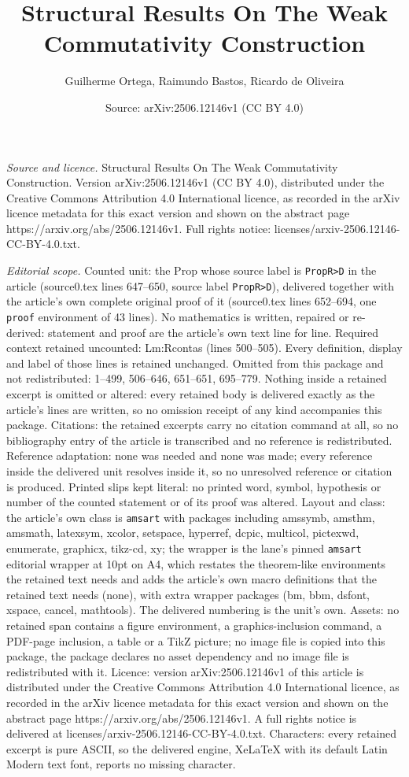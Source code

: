 \documentclass[10pt,a4paper]{amsart}
\title[Structural Results On The Weak Commutativity Construction]{Structural Results On The Weak Commutativity Construction}
\author{Guilherme Ortega, Raimundo Bastos, Ricardo de Oliveira}
\date{Source: arXiv:2506.12146v1 (CC BY 4.0)}
\begin{document}
\maketitle

\noindent\emph{Source and licence.} Structural Results On The Weak Commutativity Construction. Version arXiv:2506.12146v1 (CC BY 4.0), distributed under the Creative Commons Attribution 4.0 International licence, as recorded in the arXiv licence metadata for this exact version and shown on the abstract page https://arxiv.org/abs/2506.12146v1. Full rights notice: licenses/arxiv-2506.12146-CC-BY-4.0.txt.\par\smallskip

\noindent\textit{Editorial scope.} Counted unit: the Prop whose source label is \texttt{PropR>D} in the article (source0.tex lines 647--650, source label \texttt{PropR>D}), delivered together with the article's own complete original proof of it (source0.tex lines 652--694, one \texttt{proof} environment of 43 lines). No mathematics is written, repaired or re-derived: statement and proof are the article's own text line for line. Required context retained uncounted: Lm:Rcontas (lines 500--505). Every definition, display and label of those lines is retained unchanged. Omitted from this package and not redistributed: 1--499, 506--646, 651--651, 695--779. Nothing inside a retained excerpt is omitted or altered: every retained body is delivered exactly as the article's lines are written, so no omission receipt of any kind accompanies this package. Citations: the retained excerpts carry no citation command at all, so no bibliography entry of the article is transcribed and no reference is redistributed. Reference adaptation: none was needed and none was made; every reference inside the delivered unit resolves inside it, so no unresolved reference or citation is produced. Printed slips kept literal: no printed word, symbol, hypothesis or number of the counted statement or of its proof was altered. Layout and class: the article's own class is \texttt{amsart} with packages including amssymb, amsthm, amsmath, latexsym, xcolor, setspace, hyperref, dcpic, multicol, pictexwd, enumerate, graphicx, tikz-cd, xy; the wrapper is the lane's pinned \texttt{amsart} editorial wrapper at 10pt on A4, which restates the theorem-like environments the retained text needs and adds the article's own macro definitions that the retained text needs (none), with extra wrapper packages (bm, bbm, dsfont, xspace, cancel, mathtools). The delivered numbering is the unit's own. Assets: no retained span contains a figure environment, a graphics-inclusion command, a PDF-page inclusion, a table or a TikZ picture; no image file is copied into this package, the package declares no asset dependency and no image file is redistributed with it. Licence: version arXiv:2506.12146v1 of this article is distributed under the Creative Commons Attribution 4.0 International licence, as recorded in the arXiv licence metadata for this exact version and shown on the abstract page https://arxiv.org/abs/2506.12146v1. A full rights notice is delivered at licenses/arxiv-2506.12146-CC-BY-4.0.txt. Characters: every retained excerpt is pure ASCII, so the delivered engine, XeLaTeX with its default Latin Modern text font, reports no missing character.
\end{document}
